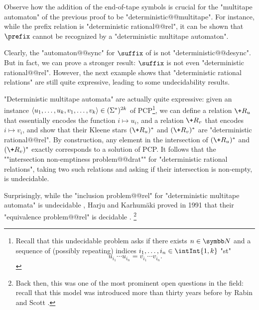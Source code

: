 Observe how the addition of the end-of-tape symbols is crucial for the "multitape automaton"
of the previous proof to be "deterministic@@multitape". For instance, while
the prefix relation is "deterministic rational@@rel", it can be shown that
$\prefix$ cannot be recognized by a "deterministic multitape automaton".

Clearly, the "automaton@@sync" for $\suffix$ of  is not "deterministic@@desync".
But in fact, we can prove a stronger result: $\suffix$ is not even "deterministic rational@@rel".%
However, the next example shows that "deterministic rational relations" are still quite expressive,
leading to some undecidability results.

\begin{example}
	\AP\label{ex:PCP-is-det-rat}
	"Deterministic multitape automata" are actually quite expressive:
	given an instance $\langle u_1,\dotsc,u_k, v_1,\dotsc,v_k\rangle \in (\Sigma^*)^{2k}$ 
	of PCP\footnote{Recall that this undecidable problem asks if there exists $n\in\N$
	and a sequence of (possibly repeating)
	indices $i_1,\dotsc, i_n \in \intInt{1,k}$ "st"
	\[u_{i_1}\cdots u_{i_n} = v_{i_1}\cdots v_{i_n}.\]},
	we can define a relation $\+R_u$ that essentially encodes the function
	$i \mapsto u_i$, and a relation $\+R_v$ that encodes $i \mapsto v_i$,
	and show that their Kleene stars $(\+R_u)^*$ and $(\+R_v)^*$ are "deterministic rational@@rel".
	By construction, any element in the intersection of $(\+R_u)^*$ and $(\+R_v)^*$
	exactly corresponds to a solution of PCP.
	It follows that the \AP""intersection non-emptiness problem@@drat""
	for "deterministic rational relations",
	taking two such relations and asking if their intersection is non-empty, is undecidable.
\end{example}

Surprisingly, while the "inclusion problem@@rel" for "deterministic multitape automata" is undecidable
\cite{FischerRosenberg1968Multitape}, Harju and Karhumäki proved in 1991 that their
"equivalence problem@@rel"
is decidable \cite[Theorem~3.11]{HarjuKarhumaki1991Equivalence}.%
\footnote{Back then, this was one of the most prominent open questions in the field: recall that 
this model was introduced more than thirty years before by Rabin
and Scott \cite{RabinScott1959FiniteAutomata}.}

